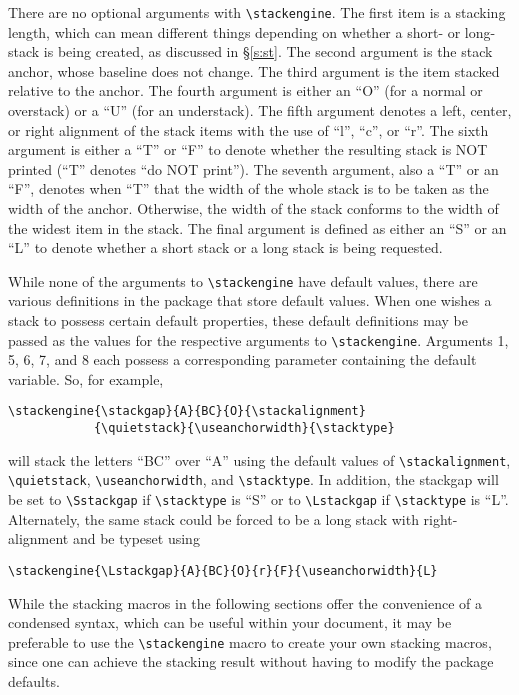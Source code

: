 \documentclass{article}
\let\vb\verb
\begin{document}
There are no optional arguments with \vb|\stackengine|.  The first
item is a stacking length, which can mean different things depending on
whether a short- or long-stack is being created, as discussed in
\S\ref{s:st}.  The second argument is the stack anchor, whose
baseline does not change.  The third argument is the item stacked
relative to the anchor.  The fourth argument is either an ``O'' (for a
normal or overstack) or a ``U'' (for an understack).  The fifth argument
denotes a left, center, or right alignment of the stack items with the
use of ``l'', ``c'', or ``r''.  The sixth argument is either a ``T'' or
``F'' to denote whether the resulting stack is NOT printed (``T''
denotes ``do NOT print'').  The seventh argument, also a ``T'' or an
``F'', denotes when ``T'' that the width of the whole stack is to be
taken as the width of the anchor.  Otherwise, the width of the stack
conforms to the width of the widest item in the stack.  The final
argument is defined as either an ``S'' or an ``L'' to denote whether a
short stack or a long stack is being requested.

While none of the arguments to \vb|\stackengine| have default values,
there are various definitions in the package that store default values.
When one wishes a stack to possess certain default properties, these
default definitions may be passed as the values for the respective
arguments to \vb|\stackengine|.  Arguments 1, 5, 6, 7, and 8 each
possess a corresponding parameter containing the default variable.  So,
for example,

\begin{verbatim}
\stackengine{\stackgap}{A}{BC}{O}{\stackalignment}
            {\quietstack}{\useanchorwidth}{\stacktype}
\end{verbatim}

will stack the letters ``BC'' over ``A'' using the default values of
\vb|\stackalignment|, \vb|\quietstack|, \vb|\useanchorwidth|,
and \vb|\stacktype|.  In addition, the stackgap will be set to
\vb|\Sstackgap| if \vb|\stacktype| is ``S'' or to \vb|\Lstackgap|
if \vb|\stacktype| is ``L''.  Alternately, the  same stack could be 
forced to be a long stack with right-alignment and be typeset using

\begin{verbatim}
\stackengine{\Lstackgap}{A}{BC}{O}{r}{F}{\useanchorwidth}{L}
\end{verbatim}
\vspace{-0.8ex}

While the stacking macros in the following sections offer the convenience 
of a condensed syntax, which can be useful within your document, it may be
preferable to use the \vb|\stackengine| macro to create your own
stacking macros, since one can achieve the stacking result without 
having to modify the package defaults.
\end{document}
